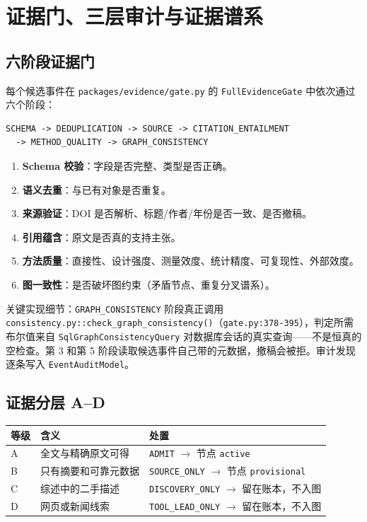 \section{证据门、三层审计与证据谱系}

\subsection{六阶段证据门}

每个候选事件在 \texttt{packages/evidence/gate.py} 的 \texttt{FullEvidenceGate} 中依次通过六个阶段：

\begin{lstlisting}
SCHEMA -> DEDUPLICATION -> SOURCE -> CITATION_ENTAILMENT
  -> METHOD_QUALITY -> GRAPH_CONSISTENCY
\end{lstlisting}

\begin{enumerate}
\item \textbf{Schema 校验}：字段是否完整、类型是否正确。
\item \textbf{语义去重}：与已有对象是否重复。
\item \textbf{来源验证}：DOI 是否解析、标题/作者/年份是否一致、是否撤稿。
\item \textbf{引用蕴含}：原文是否真的支持主张。
\item \textbf{方法质量}：直接性、设计强度、测量效度、统计精度、可复现性、外部效度。
\item \textbf{图一致性}：是否破坏图约束（矛盾节点、重复分叉谱系）。
\end{enumerate}

关键实现细节：\texttt{GRAPH\_CONSISTENCY} 阶段真正调用 \texttt{consistency.py::check\_graph\_consistency()}（\texttt{gate.py:378-395}），判定所需布尔值来自 \texttt{SqlGraphConsistencyQuery} 对数据库会话的真实查询——不是恒真的空检查。第 3 和第 5 阶段读取候选事件自己带的元数据，撤稿会被拒。审计发现逐条写入 \texttt{EventAuditModel}。

\subsection{证据分层 A–D}

\begin{table}[h]
\centering
\small
\begin{tabular}{@{}lll@{}}
\toprule
\textbf{等级} & \textbf{含义} & \textbf{处置} \\
\midrule
A & 全文与精确原文可得 & \texttt{ADMIT} $\rightarrow$ 节点 \texttt{active} \\
B & 只有摘要和可靠元数据 & \texttt{SOURCE\_ONLY} $\rightarrow$ 节点 \texttt{provisional} \\
C & 综述中的二手描述 & \texttt{DISCOVERY\_ONLY} $\rightarrow$ 留在账本，不入图 \\
D & 网页或新闻线索 & \texttt{TOOL\_LEAD\_ONLY} $\rightarrow$ 留在账本，不入图 \\
\bottomrule
\end{tabular}
\end{table}

